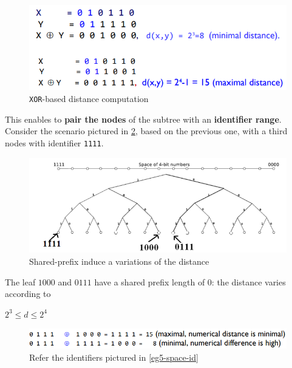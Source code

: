 \documentclass[10pt,a4paper]{report}
\begin{document}
\begin{figure}
	\centering
	\includegraphics[scale=0.60]{images/Pasted image 20230304104814.png}
	\caption{\texttt{XOR}-based distance computation}
\label{eg3-distance-computation}
\end{figure}

This enables to \textbf{pair the nodes} of the subtree with an \textbf{identifier range}.
Consider the scenario pictured in \ref{eg4-identifier-space}, based on the previous one, with a third nodes with identifier \texttt{1111}. 
\begin{figure}[h]
	\includegraphics[scale=0.60]{images/Pasted image 20230304104911.png}
	\caption{Shared-prefix induce a variations of the distance}
\label{eg4-identifier-space}
\end{figure}


The leaf $1000$ and $0111$ have a shared prefix length of $0$: the distance varies according to
\begin{center}
	$2^{3} \leq d \le 2^{4}$
\end{center}

\begin{figure}[h]
	\includegraphics[scale=0.60]{images/Pasted image 20230304105059.png}
	\caption{Refer the identifiers pictured in \ref{eg5-space-id}}
	\label{eg5-xor}
\end{figure}
\end{document}
